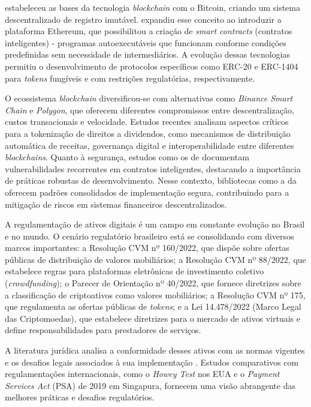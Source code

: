 \documentclass[12pt, a4paper, oneside, openright, chapter=TITLE]{abntex2}
\begin{document}
 estabeleceu as bases da tecnologia \textit{blockchain} com o Bitcoin, criando um sistema descentralizado de registro imutável.  expandiu esse conceito ao introduzir a plataforma Ethereum, que possibilitou a criação de \textit{smart contracts} (contratos inteligentes) - programas autoexecutáveis que funcionam conforme condições predefinidas sem necessidade de intermediários. A evolução dessas tecnologias permitiu o desenvolvimento de protocolos específicos como ERC-20 e ERC-1404 para \textit{tokens} fungíveis e com restrições regulatórias, respectivamente.

O ecossistema \textit{blockchain} diversificou-se com alternativas como \textit{Binance Smart Chain} e \textit{Polygon}, que oferecem diferentes compromissos entre descentralização, custos transacionais e velocidade. Estudos recentes \cite{zhitomirskiy2023tokenizing, saesen2025power, LI2025100286} analisam aspectos críticos para a tokenização de direitos a dividendos, como mecanismos de distribuição automática de receitas, governança digital e interoperabilidade entre diferentes \textit{blockchains}. Quanto à segurança, estudos como os de  documentam vulnerabilidades recorrentes em contratos inteligentes, destacando a importância de práticas robustas de desenvolvimento. Nesse contexto, bibliotecas como a da  oferecem padrões consolidados de implementação segura, contribuindo para a mitigação de riscos em sistemas financeiros descentralizados.

A regulamentação de ativos digitais é um campo em constante evolução no Brasil e no mundo. O cenário regulatório brasileiro está se consolidando com diversos marcos importantes: a Resolução CVM nº 160/2022, que dispõe sobre ofertas públicas de distribuição de valores mobiliários; a Resolução CVM nº 88/2022, que estabelece regras para plataformas eletrônicas de investimento coletivo (\textit{crowdfunding}); o Parecer de Orientação nº 40/2022, que fornece diretrizes sobre a classificação de criptoativos como valores mobiliários; a Resolução CVM nº 175, que regulamenta as ofertas públicas de \textit{tokens}; e a Lei 14.478/2022 (Marco Legal das Criptomoedas), que estabelece diretrizes para o mercado de ativos virtuais e define responsabilidades para prestadores de serviços. 

A literatura jurídica analisa a conformidade desses ativos com as normas vigentes \cite{dias2020} e os desafios legais associados à sua implementação \cite{barreto2022}. Estudos comparativos com regulamentações internacionais, como o \textit{Howey Test} nos EUA e o \textit{Payment Services Act} (PSA) de 2019 em Singapura, fornecem uma visão abrangente das melhores práticas e desafios regulatórios.
\end{document}
